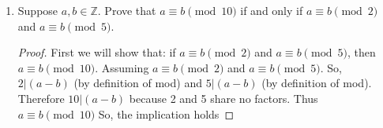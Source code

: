 \documentclass{article}
\newcommand{\ints}{\mathbb{Z}}
\begin{document}
\begin{enumerate}
\begin{proof}
			\textbf{case 2:} $y = x^2$ \\
			Consider $x^4 + x^3$, 
			\begin{align*}
				x^4+x^3 &= x^4 + x^3\\
				&= (x^2)^2+(x^2)x & \text{(by factoring)}\\
				&= y^2+yx & \text{(by substitution)}\\
				\\
				x^4+x^3 &= x^4 + x^3\\
				&= x^2(x^2)+x^3 & \text{(by factoring)}\\
				&= x^2y+x^3 & \text{(by substitution)}.
			\end{align*} 
			Thus, $x^3+x^2y =y^3+xy$ when $y=x^2$. 
			since both cases hold so does the implication.
			
			next consider the implication: if $x^3 + x^2y=y^2 +xy$, then  $y = x^2$ or $y = -x$.
			Assume for the sake of contradiction that:
			$x^3 + x^2y=y^2 +xy$ and $y \neq x^2$ and $y \neq -x$. 
			Since,
			\begin{align*}
				x^3 + x^2y &= y^2 +xy\\
				x^2(x+y) &= y(x+y) & \text{(by factoring)}\\
				\frac{x^2(x+y)}{(x+y)} &= \frac{y(x+y)}{(x+y)} & \text{(since } y \neq -x\text{)}\ \\
				x^2 &= y.
			\end{align*}
			Which is a contradiction therefore the implication holds.
			
			Since, $y = x^2$ or $y = -x$, implies $x^3 + x^2y=y^2 +xy$ and $x^3 + x^2y=y^2 +xy$, implies $y = x^2$ or $y = -x$ the original statement holds
			
		\end{proof}
		
		
		
		\setcounter{enumi}{7}
		\item Suppose $a,b \in \ints$. Prove that $a \equiv b \pmod{10}$ if and only if  $a \equiv b \pmod{2}$ and $a \equiv b \pmod{5}$.
		\begin{proof}
			First we will show that: if  $a \equiv b \pmod{2}$ and $a \equiv b \pmod{5}$, then  $a \equiv b \pmod{10}$. Assuming $a \equiv b \pmod{2}$ and $a \equiv b \pmod{5}$. So, $2|(a-b)$ (by definition of mod) and $5|(a-b)$ (by definition of mod). Therefore  $10|(a-b)$ because 2 and 5 share no factors. Thus $a \equiv b \pmod{10}$ So, the implication holds  
			

\end{proof}
\end{enumerate}
\end{document}
